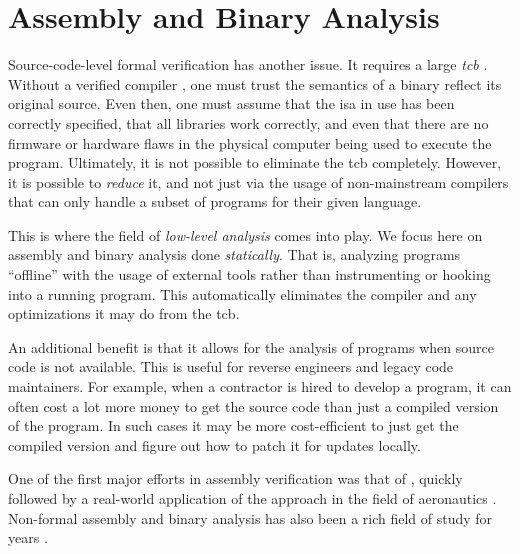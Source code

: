 \section{Assembly and Binary Analysis}\label{intro-analysis}
Source-code-level formal verification has another issue.
It requires a large \emph{\ac{tcb}}
\autocites[270]{lampson1992authentication}{orange-book}[13]{rushby1981dvss}.
Without a verified compiler \autocite{leroy:compcert}, one must trust the semantics of a binary reflect its original source.
Even then, one must assume that the \ac{isa} in use has been correctly specified, that all libraries work correctly, and even that there are no firmware or hardware flaws in the physical computer being used to execute the program.
Ultimately, it is not possible to eliminate the \ac{tcb} completely.
However, it is possible to \emph{reduce} it, and not just via the usage of non-mainstream compilers that can only handle a subset of programs for their given language.

This is where the field of \emph{low-level analysis} comes into play.
We focus here on assembly and binary analysis done \emph{statically}.
That is, analyzing programs ``offline'' with the usage of external tools rather than instrumenting or hooking into a running program.
This automatically eliminates the compiler and any optimizations it may do from the \ac{tcb}.

An additional benefit is that it allows for the analysis of programs when source code is not available.
This is useful for reverse engineers and legacy code maintainers.
For example, when a contractor is hired to develop a program, it can often cost a lot more money to get the source code than just a compiled version of the program.
In such cases it may be more cost-efficient to just get the compiled version and figure out how to patch it for updates locally.

One of the first major efforts in assembly verification was that of \textcite{clutterbuck1986validation,clutterbuck1988verification}, quickly followed by a real-world application of the approach in the field of aeronautics \autocite{oneill1988verification}.
Non-formal assembly and binary analysis has also been a rich field of study for years \autocite{kruegel2005automating,brumley2011bap,wang2017angr}.

